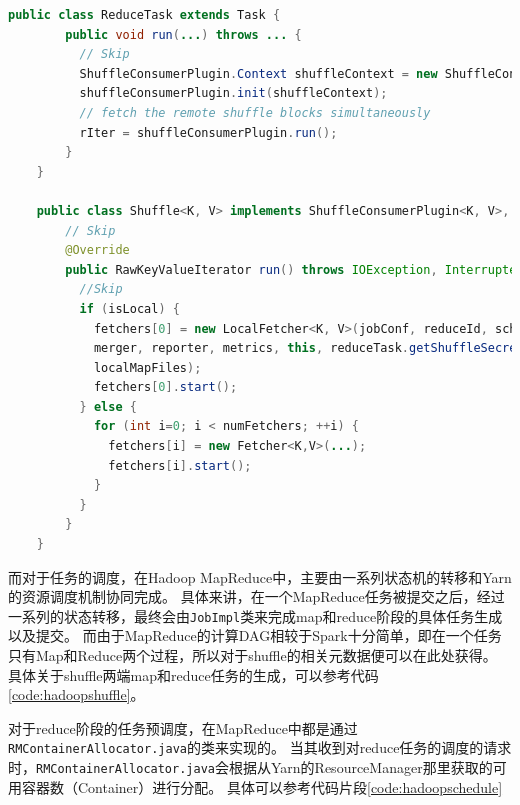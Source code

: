 \begin{lstlisting}[language={Java}, caption={Hadoop MapReduce中reduce阶段的shuffle读代码片段}, label={code:hadoopreduce}]
    public class ReduceTask extends Task {
        public void run(...) throws ... {
          // Skip
          ShuffleConsumerPlugin.Context shuffleContext = new ShuffleConsumerPlugin.Context(...);
          shuffleConsumerPlugin.init(shuffleContext);
          // fetch the remote shuffle blocks simultaneously
          rIter = shuffleConsumerPlugin.run();
        }
    }

    public class Shuffle<K, V> implements ShuffleConsumerPlugin<K, V>, ExceptionReporter {
        // Skip
        @Override
        public RawKeyValueIterator run() throws IOException, InterruptedException {
          //Skip
          if (isLocal) {
            fetchers[0] = new LocalFetcher<K, V>(jobConf, reduceId, scheduler,
            merger, reporter, metrics, this, reduceTask.getShuffleSecret(),
            localMapFiles);
            fetchers[0].start();
          } else {
            for (int i=0; i < numFetchers; ++i) {
              fetchers[i] = new Fetcher<K,V>(...);
              fetchers[i].start();
            }
          }
        }
    }
\end{lstlisting}

而对于任务的调度，在Hadoop MapReduce中，主要由一系列状态机的转移和Yarn\cite{yarn}的资源调度机制协同完成。
具体来讲，在一个MapReduce任务被提交之后，经过一系列的状态转移，最终会由\verb|JobImpl|类来完成map和reduce阶段的具体任务生成以及提交。
而由于MapReduce的计算DAG相较于Spark十分简单，即在一个任务只有Map和Reduce两个过程，所以对于shuffle的相关元数据便可以在此处获得。
具体关于shuffle两端map和reduce任务的生成，可以参考代码\ref{code:hadoopshuffle}。

对于reduce阶段的任务预调度，在MapReduce中都是通过\verb|RMContainerAllocator.java|的类来实现的。
当其收到对reduce任务的调度的请求时，\verb|RMContainerAllocator.java|会根据从Yarn的ResourceManager那里获取的可用容器数（Container）进行分配。
具体可以参考代码片段\ref{code:hadoopschedule}

